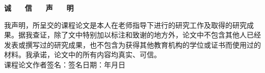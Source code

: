 \begin{center}
  \textbf{\kaishu 诚 ~~ 信 ~~ 声 ~~ 明}
\end{center}\par
\vspace{10mm}
\kaishu
我声明，所呈交的课程论文是本人在老师指导下进行的研究工作及取得的研究成果。据我查证，除了文中特别加以标注和致谢的地方外，论文中不包含其他人已经发表或撰写过的研究成果，也不包含为获得其他教育机构的学位或证书而使用过的材料。我承诺，论文中的所有内容均真实、可信。\\[45mm]
课程论文作者签名：\hspace{30mm}签名日期：\qquad 年\quad 月\quad 日
\newpage
